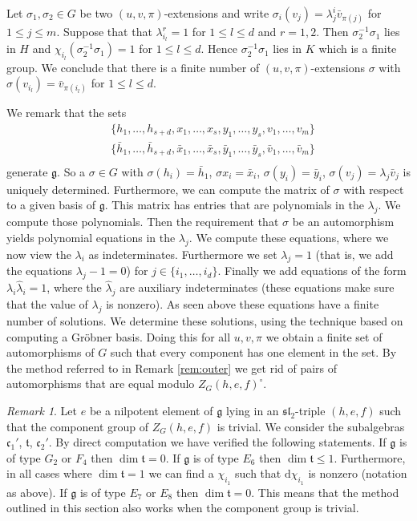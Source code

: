 \documentclass[a4paper,10pt]{amsart}
\newcommand{\mf}{\mathfrak}
\newcommand{\g}{\mf{g}}
\newcommand{\ssl}{\mf{sl}}
\renewcommand{\c}{\mf{c}}
\newcommand{\ttt}{\mf{t}}
\numberwithin{equation}{section}
\theoremstyle{remark}
\theoremstyle{remark}
\newtheorem{rmk}[theorem]{Remark}
\begin{document}
Let $\sigma_1,\sigma_2\in G$ be two $(u,v,\pi)$-extensions and write
$\sigma_i(v_j) = \lambda_j^i \bar v_{\pi(j)}$ for $1\leq j\leq m$.  
Suppose  that that $\lambda_{i_l}^r=1$ for $1\leq l\leq d$ and $r=1,2$. Then
$\sigma_2^{-1}\sigma_1$ lies in $H$ and $\chi_{i_l}(\sigma_2^{-1}\sigma_1) = 1$ for
$1\leq l\leq d$. Hence $\sigma_2^{-1}\sigma_1$ lies in $K$ which is a finite
group. We conclude that there is a finite number of $(u,v,\pi)$-extensions
$\sigma$ with $\sigma(v_{i_l}) = \bar v_{\pi(i_l)}$ for $1\leq l\leq d$. 

We remark that the sets
\begin{align*}
  & \{h_1,\ldots,h_{s+d},x_1,\ldots,x_s,y_1,\ldots,y_s,v_1,\ldots,v_m\}\\
  & \{\bar h_1,\ldots,\bar h_{s+d},\bar x_1,\ldots,\bar x_s,\bar y_1,\ldots,
  \bar y_s,\bar v_1,\ldots,\bar v_m\}\\
\end{align*}
generate $\g$. So a $\sigma\in G$ with $\sigma(h_i) = \bar h_1$, $\sigma x_i =
\bar x_i$, $\sigma(y_i) = \bar y_i$, $\sigma(v_j) = \lambda_j \bar v_j$ is
uniquely determined. Furthermore, we can compute the matrix of $\sigma$
with respect to a given basis of $\g$. This matrix has entries that are
polynomials in the $\lambda_j$. We compute those polynomials. Then the
requirement that $\sigma$ be an automorphism yields polynomial equations
in the $\lambda_j$. We compute these equations, where we now view the
$\lambda_i$ as indeterminates. Furthermore we set $\lambda_j=1$ (that is, we
add the equations $\lambda_j-1=0$) for $j\in \{i_1,\ldots,i_d\}$. Finally we
add equations of the form $\lambda_i \hat\lambda_i=1$, where the
$\hat \lambda_j$ are auxiliary indeterminates (these equations make sure
that the value of $\lambda_j$ is nonzero). As seen above these equations
have a finite number of solutions. We determine these solutions, using the
technique based on computing a Gr\"obner basis. Doing this for all $u,v,\pi$
we obtain a finite set of automorphisms of $G$ such that every component
has one element in the set. By the method referred to in Remark \ref{rem:outer}
we get rid of pairs of automorphisms that are equal modulo $Z_G(h,e,f)^\circ$.

\begin{rmk}\label{triv}
Let $e$ be a nilpotent element of $\g$ lying in an $\ssl_2$-triple
$(h,e,f)$ such that the component group of $Z_G(h,e,f)$ is trivial. We consider
the subalgebras $\c_1'$, $\ttt$, $\c_2'$. By direct computation we have verified
the following statements. If $\g$ is of type $G_2$ or $F_4$ then
$\dim \ttt = 0$. If $\g$ is of type $E_6$ then $\dim \ttt\leq 1$. Furthermore,
in all cases where $\dim \ttt=1$ we can find a $\chi_{i_1}$ such that
$\mathrm{d}\chi_{i_1}$ is nonzero (notation as above). If $\g$ is of type
$E_7$ or $E_8$ then $\dim \ttt=0$. This means that the method outlined in
this section also works when the component group is trivial. 
\end{rmk}  
\end{document}
